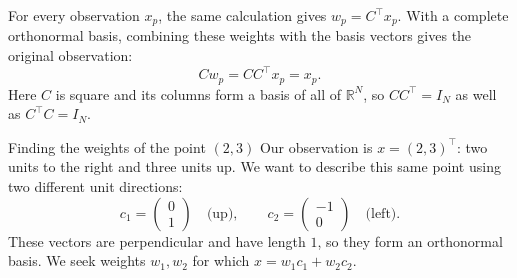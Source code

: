 \documentclass[a4paper,12pt,oneside]{report}
\begin{document}
For every observation $x_p$, the same calculation gives
$w_p=C^\top x_p$. With a complete orthonormal basis, combining
these weights with the basis vectors gives the original observation:
\[
  Cw_p=CC^\top x_p=x_p.
\]
Here $C$ is square and its columns form a basis of all of
$\mathbb{R}^N$, so $CC^\top=I_N$ as well as $C^\top C=I_N$.

\clearpage
\begin{framedexample}{Finding the weights of the point $(2,3)$}
Our observation is $x=(2,3)^\top$: two units to the right and three
units up. We want to describe this same point using two different
unit directions:
\[
  c_1=\begin{pmatrix}0\\1\end{pmatrix}
    \quad\text{(up)},\qquad
  c_2=\begin{pmatrix}-1\\0\end{pmatrix}
    \quad\text{(left)}.
\]
These vectors are perpendicular and have length $1$, so they form an
orthonormal basis. We seek weights $w_1,w_2$ for which
$x=w_1c_1+w_2c_2$.

\begin{center}
\end{center}


\end{framedexample}
\end{document}

